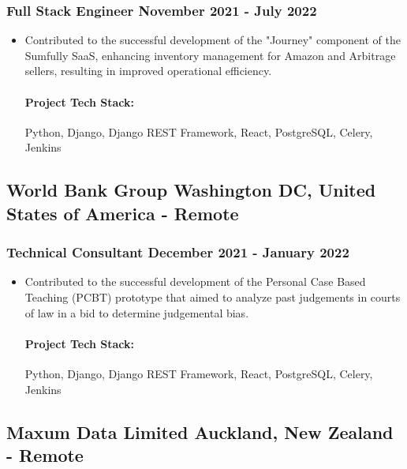 \documentclass[11pt]{article} %
\begin{document}
\subsubsection{Full Stack Engineer \hfill  November 2021 - July 2022}
\begin{itemize}
    \item Contributed to the successful development of the "Journey" component of the Sumfully SaaS, enhancing inventory management for Amazon and Arbitrage sellers, resulting in improved operational efficiency.

    \paragraph{Project Tech Stack:} Python, Django, Django REST Framework, React, PostgreSQL, Celery, Jenkins
\end{itemize}


\subsection{World Bank Group \hfill Washington DC, United States of America - Remote}
\subsubsection{Technical Consultant \hfill  December 2021 - January 2022}
\begin{itemize}
    \item Contributed to the successful development of the Personal Case Based Teaching (PCBT) prototype that aimed to analyze past judgements in courts of law in a bid to determine judgemental bias.

    \paragraph{Project Tech Stack:} Python, Django, Django REST Framework, React, PostgreSQL, Celery, Jenkins
\end{itemize}


\subsection{Maxum Data Limited \hfill Auckland, New Zealand - Remote}
\end{document}
